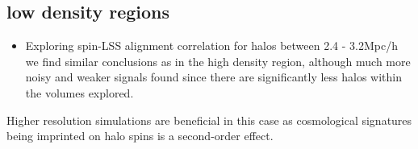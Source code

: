 \documentclass[a4paper,fleqn,usenatbib]{mnras}
\begin{document}
\subsection{low density regions}
\begin{itemize}
    \item Exploring spin-LSS alignment correlation for halos between 2.4 - 3.2Mpc/h we find similar conclusions as in the high density region, although much more noisy and weaker signals found since there are significantly less halos within the volumes explored.
\end{itemize}
Higher resolution simulations are beneficial in this case as cosmological signatures being imprinted on halo spins is a second-order effect.

 

\bsp	%
\label{lastpage}
\end{document}
